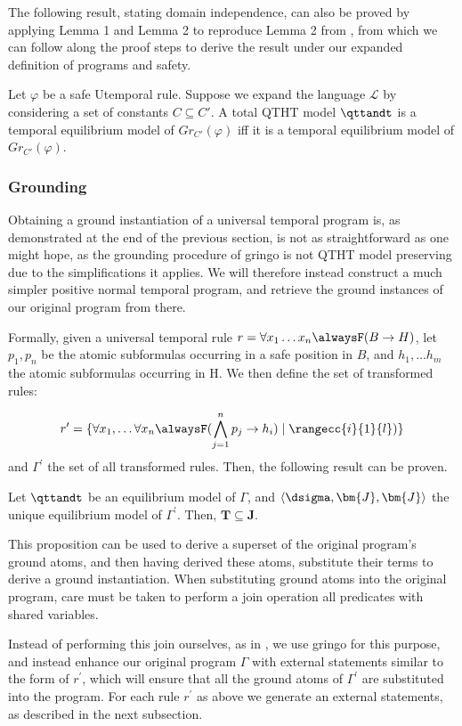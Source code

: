 The following result, stating domain independence, can also be proved
by applying Lemma 1 and Lemma 2 to reproduce Lemma 2 from
\cite{agcapevidi17a}, from which we can follow along the proof steps
to derive the result under our expanded definition of programs and
safety.

\begin{theorem}
Let $\varphi$ be a safe Utemporal rule. Suppose we expand the language $\mathcal{L}$ by considering a set of constants $C \subseteq C'$. A total QTHT model $\qttandt$ is a temporal equilibrium model of $Gr_{C'}(\varphi)$ iff it is a temporal equilibrium model of $Gr_{C'}(\varphi)$.
\end{theorem}

\subsubsection{Grounding}

Obtaining a ground instantiation of a universal temporal program is, as demonstrated at the
end of the previous section, is not as straightforward as one might
hope, as the grounding procedure of gringo is not QTHT model
preserving due to the simplifications it applies. We will therefore
instead construct a much simpler positive normal temporal program, and
retrieve the ground instances of our original program from there.

Formally, given a universal temporal rule
$r=\forall x_1 \dots x_n \alwaysF(B \rightarrow H)$, let $p_1, p_n$ be
the atomic subformulas occurring in a safe position in $B$, and
$h_1, \dots h_m$ the atomic subformulas occurring in H. We then
define the set of transformed rules:

\begin{equation*}
r^{\prime}=\{ \forall x_1, \dots \forall x_n 
\alwaysF(\bigwedge_{j=1}^{n}p_j \rightarrow h_i) \mid \rangecc{i}{1}{l} )\}
\end{equation*}
and $\Gamma^{\prime}$ the set of all transformed rules. Then, the
following result can be proven.

\begin{proposition}
Let $\qttandt$ be an equilibrium model of $\Gamma$, and $\langle \dsigma, \bm{J},\bm{J} \rangle$ the unique equilibrium model of $\Gamma^{\prime}$. Then, $\bm{T} \subseteq \bm{J}$.
\end{proposition}

This proposition can be used to derive a superset of the original
program's ground atoms, and then having derived these atoms,
substitute their terms to derive a ground instantiation. When
substituting ground atoms into the original program, care must be
taken to perform a join operation all predicates with shared
variables. 

Instead of performing this join ourselves, as in \cite{agcapevidi17a},
we use gringo for this purpose, and instead enhance our original
program $\Gamma$ with external statements similar to the form of
$r^{\prime}$, which will ensure that all the ground atoms of
$\Gamma^{\prime}$ are substituted into the program. For each rule
$r^{\prime}$ as above we generate an external statements, as described in the next subsection.
